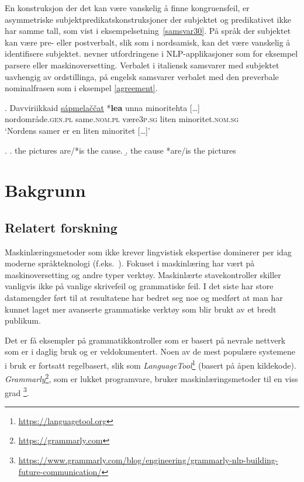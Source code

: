 \documentclass{flammie}
\begin{document}
En konstruksjon der det kan være vanskelig å finne kongruensfeil, er
asymmetriske subjektpredikats\-konstruksjoner der subjektet og predikativet ikke
har samme tall, som vist i eksempelsetning~\ref{samsvar30}. På språk der
subjektet kan være pre- eller postverbalt, slik som i nordsamisk, kan det være
vanskelig å identifisere subjektet.  \cite{Lorusso2019} nevner utfordringene i
NLP-applikasjoner som for eksempel parsere eller maskinoversetting. Verbalet i
italiensk samsvarer med subjektet uavhengig av ordstillinga, på engelsk
samsvarer verbalet med den preverbale nominalfrasen som i eksempel
\ref{agreement}.~\cite{Lorusso2019}

\exg. Davviriikkaid \underline{sápmelaččat} *\textbf{lea} unna minoritehta [\ldots]\label{samsvar30}\\
nordområde\textsc{.gen.pl} same\textsc{.nom.pl} være\textsc{3p.sg} liten minoritet\textsc{.nom.sg}\\
`Nordens samer er en liten minoritet [\ldots]'

\ex. \label{agreement}
\a.  the pictures are/*is the cause.
\b.  the cause *are/is the pictures

\section{Bakgrunn}

\subsection{Relatert forskning}

Maskinlæringsmetoder som ikke krever lingvistisk ekspertise dominerer per idag
moderne språkteknologi (f.eks.~\cite{chollampatt2018multilayer,boyd2018using}).
Fokuset i maskinlæring har vært på maskinoversetting og andre typer verktøy.
Maskinlærte stavekontroller skiller vanligvis ikke på vanlige skrivefeil og
grammatiske feil.  I det siste har store datamengder ført til at resultatene har
bedret seg noe og medført at man har kunnet laget mer avanserte grammatiske
verktøy som blir brukt av et bredt publikum.

Det er få eksempler på grammatikkontroller som er basert på nevrale nettverk som
er i daglig bruk og er veldokumentert. Noen av de mest populære systemene i bruk
er fortsatt regelbasert, slik som
\textit{LanguageTool}\footnote{\url{https://languagetool.org}} (basert på åpen
kildekode). \textit{Grammarly}\footnote{\url{https://grammarly.com}}, som er
lukket programvare, bruker maskinlæringsmetoder til en viss grad
\footnote{\url{https://www.grammarly.com/blog/engineering/grammarly-nlp-building-future-communication/}}.
\end{document}

